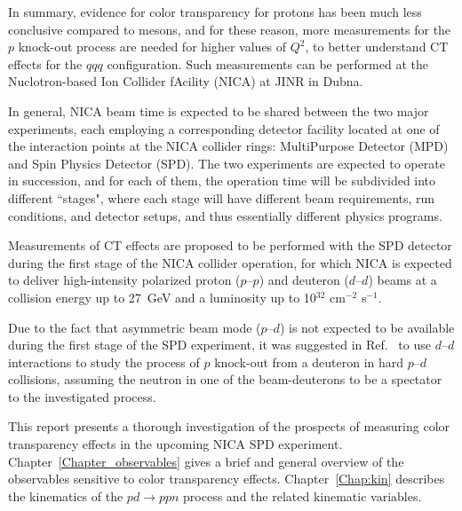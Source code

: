 In summary, evidence for color transparency for protons has been much less conclusive compared to mesons, and for these reason, more measurements for the $p$ knock-out process are needed for higher values of $Q^2$, to better understand CT effects for the $qqq$ configuration. Such measurements can be performed at the Nuclotron-based Ion Collider fAcility (NICA) at JINR in Dubna.



In general, NICA beam time is expected to be shared between the two major experiments, each employing a corresponding detector facility located at one of the interaction points at the NICA collider rings: MultiPurpose Detector (MPD) and Spin Physics Detector (SPD). The two experiments are expected to operate in succession, and for each of them, the operation time will be subdivided into different ``stages", where each stage will have different beam requirements, run conditions, and detector setups, and thus essentially different physics programs\cite{TDR_SPD,SPDproto:2021hnm,SPD_1st_stage,Arbuzov:2020cqg}. 

Measurements of CT effects are proposed to be performed with the SPD detector during the first stage of the NICA collider operation, for which NICA is expected to deliver high-intensity polarized proton ($p$--$p$) and deuteron ($d$--$d$) beams at a collision energy up to 27~GeV and a luminosity up to 10$^{32}$ cm$^{-2}$ s$^{-1}$\cite{TDR_SPD,SPDproto:2021hnm,SPD_1st_stage}.

Due to the fact that asymmetric beam mode ($p$--$d$) is not expected to be available during the first stage of the SPD experiment, it was suggested in Ref.~\cite{Larionov:2025equ} to use $d$--$d$ interactions to study the process of $p$ knock-out from a deuteron in hard $p$--$d$ collisions, assuming the neutron in one of the beam-deuterons to be a spectator to the investigated process.

This report presents a thorough investigation of the prospects of measuring color transparency effects in the upcoming NICA SPD experiment. Chapter~\ref{Chapter_observables} gives a brief and general overview of the observables sensitive to color transparency effects. Chapter~\ref{Chap:kin} describes the kinematics of the $pd\rightarrow ppn$ process and the related kinematic variables. 

